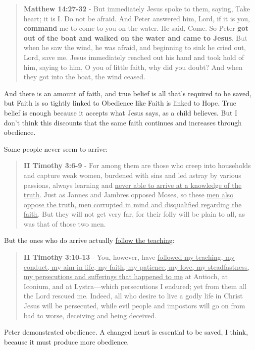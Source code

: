 \documentclass[11pt]{article}
\begin{document}
\begin{quote}
\textbf{Matthew 14:27-32} - But immediately Jesus spoke to them, saying, Take heart; it is I. Do not be afraid. And Peter answered him, Lord, if it is you, \textbf{command} me to come to you on the water. He said, Come. So Peter \textbf{got out of the boat and walked on the water and came to Jesus}. But when he saw the wind, he was afraid, and beginning to sink he cried out, Lord, save me. Jesus immediately reached out his hand and took hold of him, saying to him, O you of little faith, why did you doubt? And when they got into the boat, the wind ceased.
\end{quote}

And there is an amount of faith, and true belief is all that's required to be saved, but Faith is so tightly linked to Obedience like Faith is linked to Hope. True belief is enough because it accepts what Jesus says, as a child believes. But I don't think this discounts that the same faith continues and increases through obedience.

Some people never seem to arrive:

\begin{quote}
\textbf{II Timothy 3:6-9} - For among them are those who creep into households and capture weak women, burdened with sins and led astray by various passions, always learning and \uline{never able to arrive at a knowledge of the truth}. Just as Jannes and Jambres opposed Moses, so these \uline{men also oppose the truth, men corrupted in mind and disqualified regarding the faith}. But they will not get very far, for their folly will be plain to all, as was that of those two men.
\end{quote}

But the ones who do arrive actually \uline{follow the teaching}:

\begin{quote}
\textbf{II Timothy 3:10-13} - You, however, have \uline{followed my teaching, my conduct, my aim in life, my faith, my patience, my love, my steadfastness, my persecutions and sufferings that happened to me} at Antioch, at Iconium, and at Lystra—which persecutions I endured; yet from them all the Lord rescued me. Indeed, all who desire to live a godly life in Christ Jesus will be persecuted, while evil people and impostors will go on from bad to worse, deceiving and being deceived.
\end{quote}

Peter demonstrated obedience. A changed heart is essential to be saved, I think, because it must produce more obedience.
\end{document}
